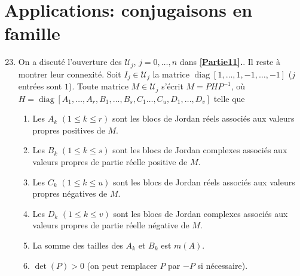 \documentclass[french]{article}
\theoremstyle{definition}
\newcommand{\Ucal}{\mathcal{U}}
\newcommand{\diag}{\operatorname{diag}}
\begin{document}
\section*{Applications: conjugaisons en famille}
    \begin{enumerate}
        \setcounter{enumi}{22}
        \item \label{Partie23} On a discut\'e l'ouverture des $\Ucal_j$, $j = 0,\ldots,n$ dans {\bf \ref{Partie11}.}. Il reste \`a montrer leur connexit\'e. Soit $I_j \in \Ucal_j$ la matrice $\diag[1,\ldots,1,-1,\ldots,-1]$ ($j$ entr\'ees sont $1$). Toute matrice $ M \in \Ucal_j$ s'\'ecrit $M = PHP^{-1}$, o\`u $H = \diag[A_1,\ldots,A_r,B_1,\ldots,B_s,C_1\ldots,C_u,D_1,\ldots,D_v]$ telle que
        \begin{enumerate}
            \item Les $A_k$ $(1 \le k \le r)$ sont les blocs de Jordan r\'eels associ\'es aux valeurs propres positives de $M$.
            
            \item Les $B_k$ $(1 \le k \le s)$ sont les blocs de Jordan complexes associ\'es aux valeurs propres de partie r\'eelle positive de $M$.
            
            \item Les $C_k$ $(1 \le k \le u)$ sont les blocs de Jordan r\'eels associ\'es aux valeurs propres n\'egatives de $M$.
            
            \item Les $D_k$ $(1 \le k \le v)$ sont les blocs de Jordan complexes associ\'es aux valeurs propres de partie r\'eelle n\'egative de $M$.
            
            \item La somme des tailles des $A_k$ et $B_k$ est $m(A)$.
            
            \item $\det(P) > 0$ (on peut remplacer $P$ par $-P$ si n\'ecessaire).
        \end{enumerate}
        

\end{enumerate}
\end{document}
